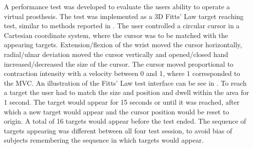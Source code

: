 A performance test was developed to evaluate the users ability to operate a virtual prosthesis. The test was implemented as a 3D Fitts' Law target reaching test, similar to methods reported in \cite{Scheme2013, Scheme2013a}. The user controlled a circular cursor in a Cartesian coordinate system, where the cursor was to be matched with the appearing targets. Extension/flexion of the wrist moved the cursor horizontally, radial/ulnar deviation moved the cursor vertically and opened/closed hand increased/decreased the size of the cursor. The cursor moved proportional to contraction intensity with a velocity between 0 and 1, where 1 corresponded to the MVC. An illustration of the Fitts' Law test interface can be see in . To reach a target the user had to match the size and position and dwell within the area for 1 second. The target would appear for 15 seconds or until it was reached, after which a new target would appear and the cursor position would be reset to origin. A total of 16 targets would appear before the test ended. The sequence of targets appearing was different between all four test session, to avoid bias of subjects remembering the sequence in which targets would appear. \\

